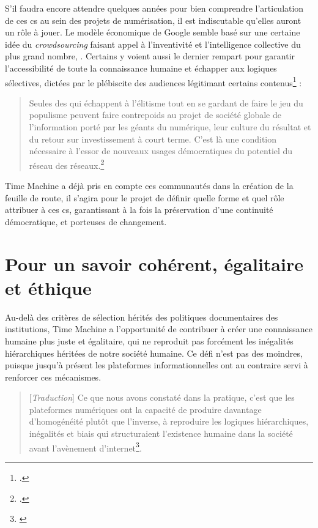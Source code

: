 S'il faudra encore attendre quelques années pour bien comprendre l'articulation de ces \gls{cs} au sein des projets de numérisation, il est indiscutable qu'elles auront un rôle à jouer. Le modèle économique de Google semble basé sur une certaine idée du \textit{crowdsourcing} faisant appel à l'inventivité et l'intelligence collective du plus grand nombre, . Certains y voient aussi le dernier rempart pour garantir l'accessibilité de toute la connaissance humaine et échapper aux logiques sélectives, dictées par le plébiscite des audiences légitimant certains contenus\footcite[p.107]{mattelart_histoire_2018} : 

\begin{quotation}
Seules des  qui échappent à l'élitisme tout en se gardant de faire le jeu du populisme peuvent faire contrepoids au projet de société globale de l'information porté par les géants du numérique, leur culture du résultat et du retour sur investissement à court terme. C'est là une condition nécessaire à l'essor de nouveaux usages démocratiques du potentiel du réseau des réseaux.\footcite[p.110]{mattelart_histoire_2018}
\end{quotation}

Time Machine a déjà pris en compte ces communautés dans la création de la feuille de route, il s'agira pour le projet de définir quelle forme et quel rôle attribuer à ces \gls{cs}, garantissant à la fois la préservation d'une continuité démocratique, et porteuses de changement.

\section {Pour un savoir cohérent, égalitaire et éthique}

Au-delà des critères de sélection hérités des politiques documentaires des institutions, Time Machine a l'opportunité de contribuer à créer une connaissance humaine plus juste et égalitaire, qui ne reproduit pas forcément les inégalités hiérarchiques héritées de notre société humaine. Ce défi n'est pas des moindres, puisque jusqu'à présent les plateformes informationnelles ont au contraire servi à renforcer ces mécanismes.

\begin{quotation}
[\textit{Traduction}]
Ce que nous avons constaté dans la pratique, c'est que les plateformes numériques ont la capacité de produire davantage d'homogénéité plutôt que l'inverse, à reproduire les logiques hiérarchiques, inégalités et biais qui structuraient l'existence humaine dans la société avant l'avènement d'internet\footnote{ \cite[p.22]{kim_race_nodate}}.
\end{quotation}

